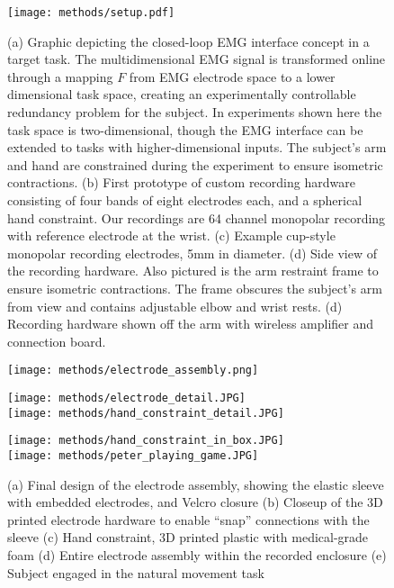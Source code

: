 \documentclass[../main.tex]{subfiles}
\begin{document}
\begin{figure}[tph]
\centering
\texttt{[image: methods/setup.pdf]}
\caption[Experimental setup prototype]{(a) Graphic depicting the closed-loop EMG interface concept in a target task. The multidimensional EMG signal is transformed online through a mapping $F$ from EMG electrode space to a lower dimensional task space, creating an experimentally controllable redundancy problem for the subject. In experiments shown here the task space is two-dimensional, though the EMG interface can be extended to tasks with higher-dimensional inputs. The subject's arm and hand are constrained during the experiment to ensure isometric contractions. (b) First prototype of custom recording hardware consisting of four bands of eight electrodes each, and a spherical hand constraint. Our recordings are 64 channel monopolar recording with reference electrode at the wrist. (c) Example cup-style monopolar recording electrodes, 5mm in diameter. (d) Side view of the recording hardware. Also pictured is the arm restraint frame to ensure isometric contractions. The frame obscures the subject's arm from view and contains adjustable elbow and wrist rests. (d) Recording hardware shown off the arm with wireless amplifier and connection board.}\label{fig:prototype_setup}
\end{figure}

\begin{figure}[tph]
  \centering
  \begin{minipage}{0.33\textwidth}
    \texttt{[image: methods/electrode\_assembly.png]}
    \subcaption{}
  \end{minipage}%
  \hspace*{5pt}
  \begin{minipage}{0.33\textwidth}
    \texttt{[image: methods/electrode\_detail.JPG]}\\
    \subcaption{}
    \texttt{[image: methods/hand\_constraint\_detail.JPG]}
    \subcaption{}
  \end{minipage}%
  \hspace*{5pt}
  \begin{minipage}{0.33\textwidth}
    \texttt{[image: methods/hand\_constraint\_in\_box.JPG]}\\
    \subcaption{}
    \texttt{[image: methods/peter\_playing\_game.JPG]}
    \subcaption{}
  \end{minipage}
  \caption[Final experimental setup]{(a) Final design of the electrode assembly, showing the elastic sleeve with embedded electrodes, and Velcro closure (b) Closeup of the 3D printed electrode hardware to enable ``snap'' connections with the sleeve (c) Hand constraint, 3D printed plastic with medical-grade foam (d) Entire electrode assembly within the recorded enclosure (e) Subject engaged in the natural movement task}\label{fig:final_setup}
\end{figure}
\end{document}
